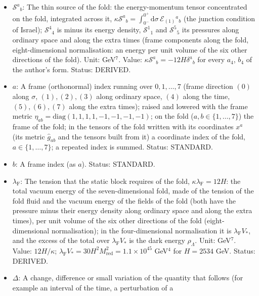 \documentclass[
  10pt,
]{article}
\providecommand{\tightlist}{%
  \setlength{\itemsep}{0pt}\setlength{\parskip}{0pt}}
\begin{document}
\begin{itemize}
\tightlist
\item
  \(\mathcal{S}^a{}_b\): The thin source of the fold: the
  energy-momentum tensor concentrated on the fold, integrated across it,
  \(\kappa\mathcal{S}^a{}_b = \int_{0^-}^{0^+}\mathrm{d}\sigma\,\mathcal{E}_{(1)}{}^a{}_b\)
  (the junction condition of Israel); \(\mathcal{S}^4{}_4\) is minus its
  energy density, \(\mathcal{S}^1{}_1\) and \(\mathcal{S}^5{}_5\) its
  pressures along ordinary space and along the extra times (frame
  components along the fold, eight-dimensional normalisation: an energy
  per unit volume of the six other directions of the fold). Unit:
  GeV\(^7\). Value: \(\kappa\mathcal{S}^a{}_b = -12H\delta^a{}_b\) for
  every \(a_4\), \(b_4\) of the author's form. Status: DERIVED.
\item
  \(a\): A frame (orthonormal) index running over \(0, 1, \dots, 7\)
  (frame direction \((0)\) along \(\sigma\), \((1), (2), (3)\) along
  ordinary space, \((4)\) along the time, \((5), (6), (7)\) along the
  extra times); raised and lowered with the frame metric
  \(\eta_{ab} = \mathrm{diag}(1, 1, 1, 1, -1, -1, -1, -1)\); on the fold
  (\(a, b \in \{1, \dots, 7\}\)) the frame of the fold; in the tensors
  of the fold written with its coordinates \(x^a\) (its metric
  \(\hat g_{ab}\) and the tensors built from it) a coordinate index of
  the fold, \(a \in \{1, \dots, 7\}\); a repeated index is summed.
  Status: STANDARD.
\item
  \(b\): A frame index (as \(a\)). Status: STANDARD.
\item
  \(\lambda_{\mathrm{F}}\): The tension that the static block requires
  of the fold, \(\kappa\lambda_{\mathrm{F}} = 12H\): the total vacuum
  energy of the seven-dimensional fold, made of the tension of the fold
  fluid and the vacuum energy of the fields of the fold (both have the
  pressure minus their energy density along ordinary space and along the
  extra times), per unit volume of the six other directions of the fold
  (eight-dimensional normalisation); in the four-dimensional
  normalisation it is \(\lambda_{\mathrm{F}}V_*\), and the excess of the
  total over \(\lambda_{\mathrm{F}}V_*\) is the dark energy
  \(\rho_\Lambda\). Unit: GeV\(^7\). Value: \(12H/\kappa\);
  \(\lambda_{\mathrm{F}}V_* = 30H^2M_{\mathrm{red}}^2 = 1.1\times10^{45}\)
  GeV\(^4\) for \(H = 2534\) GeV. Status: DERIVED.
\item
  \(\Delta\): A change, difference or small variation of the quantity
  that follows (for example an interval of the time, a perturbation of a

\end{itemize}
\end{document}
